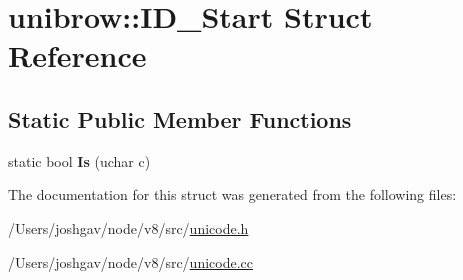 \hypertarget{structunibrow_1_1_i_d___start}{}\section{unibrow\+:\+:I\+D\+\_\+\+Start Struct Reference}
\label{structunibrow_1_1_i_d___start}
\subsection*{Static Public Member Functions}
\begin{DoxyCompactItemize}
\item 
static bool {\bfseries Is} (uchar c)\hypertarget{structunibrow_1_1_i_d___start_abb1d92d34c8fa940fe7bd9ab18cb1656}{}\label{structunibrow_1_1_i_d___start_abb1d92d34c8fa940fe7bd9ab18cb1656}

\end{DoxyCompactItemize}


The documentation for this struct was generated from the following files\+:\begin{DoxyCompactItemize}
\item 
/\+Users/joshgav/node/v8/src/\hyperlink{unicode_8h}{unicode.\+h}\item 
/\+Users/joshgav/node/v8/src/\hyperlink{unicode_8cc}{unicode.\+cc}\end{DoxyCompactItemize}
